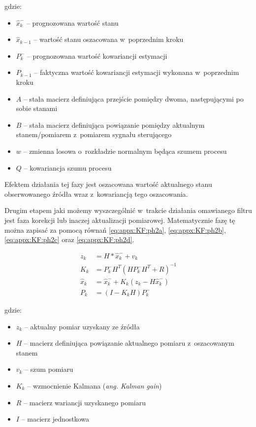 gdzie:
\begin{itemize}
	\item $\widehat{x}^-_k$ -- prognozowana wartość stanu
	\item $\widehat{x}_{k-1}$ -- wartość stanu oszacowana w~poprzednim kroku
	\item $P^-_k$ -- prognozowana wartość kowariancji estymacji
	\item $P_{k-1}$ -- faktyczna wartość kowariancji estymacji wykonana w~poprzednim kroku
	\item $A$ -- stała macierz definiująca przejście pomiędzy dwoma, następującymi po sobie stanami
	\item $B$ --  stała macierz definiująca powiązanie pomiędzy aktualnym stanem/pomiarem z~pomiarem sygnału sterującego
	\item $w$ --  zmienna losowa o~rozkładzie normalnym będąca szumem procesu
	\item $Q$ --  kowariancja szumu procesu
\end{itemize}

Efektem działania tej fazy jest oszacowana wartość aktualnego stanu obserwowanego źródła wraz z~kowariancją tego oszacowania.

Drugim etapem jaki możemy wyszczególnić w~trakcie działania omawianego filtru jest faza korekcji lub inaczej aktualizacji pomiarowej. Matematycznie fazę tę można zapisać za pomocą równań \eqref{eq:appx:KF:ph2a}, \eqref{eq:appx:KF:ph2b}, \eqref{eq:appx:KF:ph2c} oraz \eqref{eq:appx:KF:ph2d}.

\begin{subequations}
	\begin{align}
		z_k           & = H*\widehat{x}^-_k + v_k \label{eq:appx:KF:ph2a}                        \\
		K_k           & = P^-_{k}H^T(HP^-_{k}H^T + R)^{-1} \label{eq:appx:KF:ph2b}               \\
		\widehat{x}_k & = \widehat{x}^-_k + K_{k}(z_k-H\widehat{x}^-_k)  \label{eq:appx:KF:ph2c} \\
		P_k           & = (I-K_{k}H)P^-_k \label{eq:appx:KF:ph2d}                                
	\end{align}
\end{subequations}

gdzie:
\begin{itemize}
	\item $z_k$ -- aktualny pomiar uzyskany ze źródła
	\item $H$ -- macierz definiująca powiązanie aktualnego pomiaru z~oszacowanym stanem
	\item $v_k$ -- szum pomiaru
	\item $K_k$ -- wzmocnienie Kalmana (\emph{ang. Kalman gain})
	\item $R$ -- macierz wariancji uzyskanego pomiaru
	\item $I$ -- macierz jednostkowa
\end{itemize}

